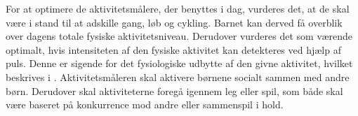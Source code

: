 For at optimere de aktivitetsmålere, der benyttes i dag, vurderes det, at de skal være i stand til at adskille gang, løb og cykling. Barnet kan derved få overblik over dagens totale fysiske aktivitetsniveau. Derudover vurderes det som værende optimalt, hvis intensiteten af den fysiske aktivitet kan detekteres ved hjælp af puls. Denne er sigende for det fysiologiske udbytte af den givne aktivitet, hvilket beskrives i .\newline
Aktivitetsmåleren skal aktivere børnene socialt sammen med andre børn. Derudover skal aktiviteterne foregå igennem leg eller spil, som både skal være baseret på konkurrence mod andre eller sammenspil i hold.